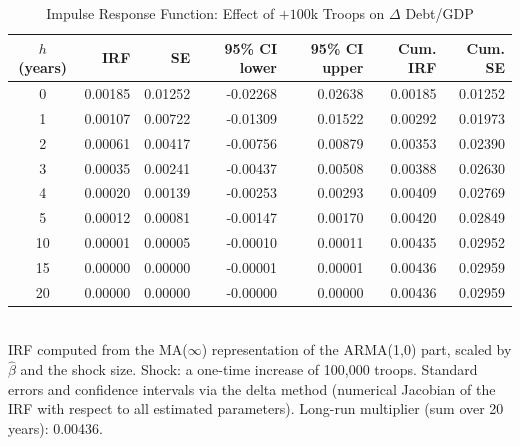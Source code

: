 \begin{table}[htbp]
  \centering
  \caption{Impulse Response Function: Effect of $+100$k Troops on $\Delta$ Debt/GDP}
  \label{tab:irf}
  \begin{tabular}{crrrrrr}
    \toprule
    $h$ (years) & IRF & SE & 95\% CI lower & 95\% CI upper & Cum. IRF & Cum. SE \\
    \midrule
    0 & 0.00185 & 0.01252 & -0.02268 & 0.02638 & 0.00185 & 0.01252 \\
    1 & 0.00107 & 0.00722 & -0.01309 & 0.01522 & 0.00292 & 0.01973 \\
    2 & 0.00061 & 0.00417 & -0.00756 & 0.00879 & 0.00353 & 0.02390 \\
    3 & 0.00035 & 0.00241 & -0.00437 & 0.00508 & 0.00388 & 0.02630 \\
    4 & 0.00020 & 0.00139 & -0.00253 & 0.00293 & 0.00409 & 0.02769 \\
    5 & 0.00012 & 0.00081 & -0.00147 & 0.00170 & 0.00420 & 0.02849 \\
    10 & 0.00001 & 0.00005 & -0.00010 & 0.00011 & 0.00435 & 0.02952 \\
    15 & 0.00000 & 0.00000 & -0.00001 & 0.00001 & 0.00436 & 0.02959 \\
    20 & 0.00000 & 0.00000 & -0.00000 & 0.00000 & 0.00436 & 0.02959 \\
    \bottomrule
  \end{tabular}
  \\[2pt] \footnotesize{IRF computed from the MA($\infty$) representation of the ARMA(1,0) part, scaled by $\hat{\beta}$ and the shock size. Shock: a one-time increase of 100,000 troops. Standard errors and confidence intervals via the delta method (numerical Jacobian of the IRF with respect to all estimated parameters). Long-run multiplier (sum over 20 years): 0.00436.}
\end{table}
